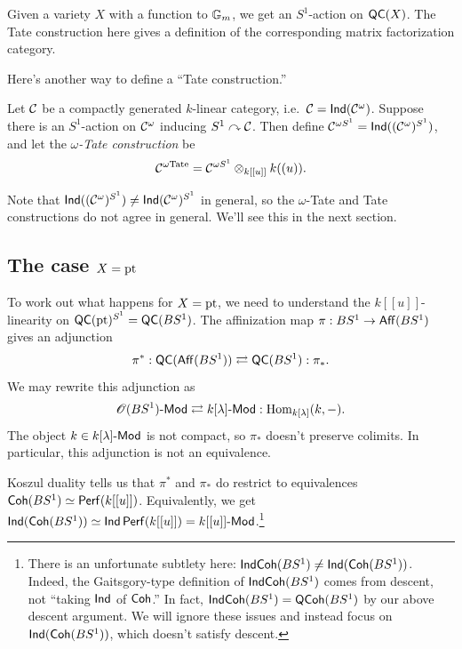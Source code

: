 \documentclass{article}
\begin{document}
\begin{rmk}
  Given a variety $X$ with a function to $\mathbb{G}_m$, we get an $S^1$-action on $\mathsf{QC}(X)$.
  The Tate construction here gives a definition of the corresponding matrix factorization category.
\end{rmk}

Here's another way to define a ``Tate construction.''

\begin{dfn}
  Let $\mathcal{C}$ be a compactly generated $k$-linear category, i.e.\ $\mathcal{C} = \operatorname{\mathsf{Ind}}(\mathcal{C}^\omega)$.
  Suppose there is an $S^1$-action on $\mathcal{C}^{\omega}$ inducing $S^1 \curvearrowright \mathcal{C}$.
  Then define $\mathcal{C}^{\omega S^1} = \operatorname{\mathsf{Ind}}((\mathcal{C}^\omega)^{S^1})$, and let the \emph{$\omega$-Tate construction} be
  \[
    \mathcal{C}^{\omega \mathrm{Tate}} = \mathcal{C}^{\omega S^1} \otimes_{k[[u]]} k((u)).
  \]
\end{dfn}

Note that $\operatorname{\mathsf{Ind}}((\mathcal{C}^\omega)^{S^1}) \neq \operatorname{\mathsf{Ind}}(\mathcal{C}^\omega)^{S^1}$ in general, so the $\omega$-Tate and Tate constructions do not agree in general.
We'll see this in the next section.

\subsection{The case $X = \operatorname{pt}$}

To work out what happens for $X = \operatorname{pt}$, we need to understand the $k[[u]]$-linearity on $\mathsf{QC}(\operatorname{pt})^{S^1} = \mathsf{QC}(BS^1)$.
The affinization map $\pi: BS^1 \to \mathsf{Aff}(BS^1)$ gives an adjunction
\[
  \pi^*: \mathsf{QC}(\mathsf{Aff}(BS^1)) \rightleftarrows \mathsf{QC}(BS^1) : \pi_*.
\]
We may rewrite this adjunction as
\[
  \mathscr{O}(BS^1)\text{-}\mathsf{Mod} \rightleftarrows k[\lambda]\text{-}\mathsf{Mod} : \operatorname{Hom}_{k[\lambda]}(k, -).
\]
The object $k \in k[\lambda]\text{-}\mathsf{Mod}$ is not compact, so $\pi_*$ doesn't preserve colimits.
In particular, this adjunction is not an equivalence.

Koszul duality tells us that $\pi^*$ and $\pi_*$ do restrict to equivalences $\mathsf{Coh}(BS^1) \simeq \mathsf{Perf}(k[[u]])$.
Equivalently, we get $\operatorname{\mathsf{Ind}}(\mathsf{Coh}(BS^1)) \simeq \operatorname{\mathsf{Ind}}\mathsf{Perf}(k[[u]]) = k[[u]]\text{-}\mathsf{Mod}$.\footnote{There is an unfortunate subtlety here:
$\mathsf{IndCoh}(BS^1) \neq \operatorname{\mathsf{Ind}}(\mathsf{Coh}(BS^1))$.
Indeed, the Gaitsgory-type definition of $\mathsf{IndCoh}(BS^1)$ comes from descent, not ``taking $\operatorname{\mathsf{Ind}}$ of $\mathsf{Coh}$.''
In fact, $\mathsf{IndCoh}(BS^1) = \mathsf{QCoh}(BS^1)$ by our above descent argument.
We will ignore these issues and instead focus on $\operatorname{\mathsf{Ind}}(\mathsf{Coh}(BS^1))$, which doesn't satisfy descent.}
\end{document}

